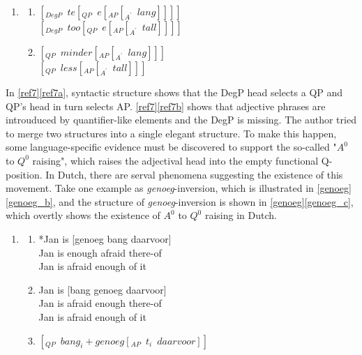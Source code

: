 \documentclass{ctexart}
\begin{document}
\begin{enumerate}[resume]
\item \label{ref7}

\begin{enumerate}
\item \label{ref7a} 
$[_{DegP} \enspace te[_{QP} \enspace e[_{AP}[_{A^{\prime}} \enspace lang]]]]$ \\
$[_{DegP} \enspace too[_{QP} \enspace e[_{AP}[_{A^{\prime}} \enspace tall]]]]$
\item \label{ref7b} 
$[_{QP} \enspace minder[_{AP}[_{A^{\prime}}\enspace lang]]]$ \\
$[_{QP} \enspace less[_{AP}[_{A^{\prime}}\enspace tall]]]$

\end{enumerate} 
    
\end{enumerate} 

In \ref{ref7}\ref{ref7a}, syntactic structure shows that the DegP head selects a QP and QP's head in turn selects AP. \ref{ref7}\ref{ref7b} shows that adjective phrases are introuduced by quantifier-like elements and the DegP is missing. The author tried to merge two structures into a single elegant structure. To make this happen, some language-specific evidence must be discovered to support the so-called "$A^0$ to $Q^0$ raising", which raises the adjectival head into the empty functional Q-position. In Dutch, there are serval phenomena suggesting the existence of this movement. Take one example as \textit{genoeg}-inversion, which is illustrated in \ref{genoeg}\ref{genoeg_b}, and the structure of \textit{genoeg}-inversion is shown in \ref{genoeg}\ref{genoeg_c}, which overtly shows the existence of $A^0$ to $Q^0$ raising in Dutch.

\begin{enumerate}[resume]
\item \label{genoeg}
\begin{enumerate}

\item 
*Jan is [genoeg bang daarvoor] \\
Jan is enough afraid there-of \\
Jan is afraid enough of it

\item \label{genoeg_b} 
Jan is [bang genoeg daarvoor] \\
Jan is afraid enough there-of \\
Jan is afraid enough of it

\item \label{genoeg_c} $[_{QP} \enspace bang_i + genoeg[_{AP} \enspace t_i \enspace daarvoor]]$

\end{enumerate} 
\end{enumerate} 
\end{document}
